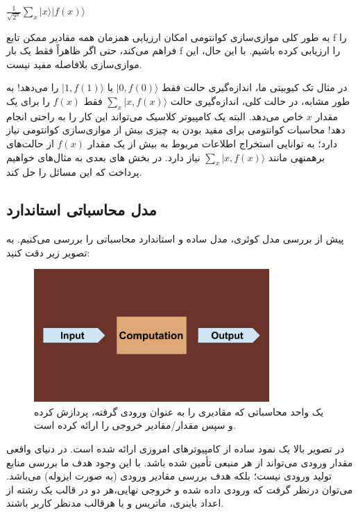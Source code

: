 \documentclass{book}
\begin{document}
\begin{center}
	$\frac{1}{\sqrt{2^n}} \sum_{x} \vert x \rangle \vert f (x)\rangle$ 
\end{center}


به طور کلی موازی‌سازی کوانتومی امکان ارزیابی همزمان همه مقادیر ممکن تابع f را فراهم می‌کند، حتی اگر ظاهراً فقط یک بار f را ارزیابی کرده باشیم. با این حال، این موازی‌سازی بلافاصله مفید نیست. 

در مثال تک کیوبیتی ما، اندازه‌گیری حالت فقط $\vert 0, f(0)\rangle$ یا $\vert 1, f(1)\rangle$ را می‌دهد! به طور مشابه، در حالت کلی، اندازه‌گیری حالت $\sum_{x} \vert x, f(x) \rangle$ فقط $ f (x)$ را برای یک مقدار $x$ خاص می‌دهد. البته یک کامپیوتر کلاسیک می‌تواند این کار را به راحتی انجام دهد! محاسبات کوانتومی برای مفید بودن به چیزی بیش از موازی‌سازی کوانتومی نیاز دارد؛ به توانایی استخراج اطلاعات مربوط به بیش از یک مقدار $f (x)$ از حالت‌های برهمنهی مانند $\sum _{x}\vert x, f(x) \rangle$ نیاز دارد. 
در بخش های بعدی به مثال‌های خواهیم پرداخت که این مسائل را حل کند.

\newpage
\subsection{مدل محاسباتی استاندارد}
پیش از بررسی مدل کوئری،‌ مدل ساده و استاندارد محاسباتی را بررسی می‌کنیم. به تصویر زیر دقت کنید:

\begin{figure}[ht]
	\centering
	\includegraphics[width=0.8\textwidth]{standard computation model.png}
	\caption{یک واحد محاسباتی که مقادیری را به عنوان ورودی گرفته، پردازش کرده و سپس مقدار/مقادیر خروجی را ارائه کرده است.}
\end{figure}


در تصویر بالا یک نمود ساده از کامپیوتر‌های امروزی ارائه شده است. در دنیای واقعی مقدار ورودی می‌تواند از هر منبعی‌ تأمین شده باشد. با این وجود هدف ما بررسی منابع تولید ورودی نیست؛‌ بلکه هدف بررسی مقادیر ورودی (به صورت ایزوله) می‌باشد. می‌توان درنظر گرفت که ورودی داده شده و خروجی نهایی،‌هر دو در قالب یک رشته از اعداد باینری، ماتریس و یا هرقالب مدنظر کاربر باشند.
\end{document}
